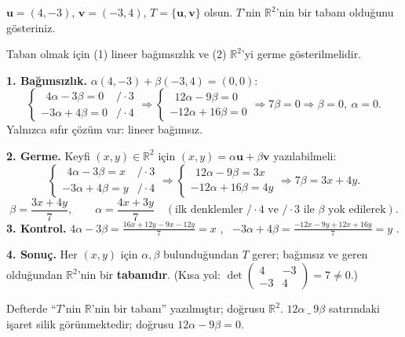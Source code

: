 \begin{soru}
$\mathbf u=(4,-3)$, $\mathbf v=(-3,4)$, $T=\{\mathbf u,\mathbf v\}$ olsun. $T$'nin $\mathbb R^2$'nin bir tabanı olduğunu gösteriniz.
\end{soru}
\begin{cevap}
Taban olmak için (1) lineer bağımsızlık ve (2) $\mathbb R^2$'yi germe gösterilmelidir.

\textbf{1. Bağımsızlık.} $\alpha(4,-3)+\beta(-3,4)=(0,0)$:
\[
\begin{cases}\ \ 4\alpha-3\beta=0 & /\cdot 3\\ -3\alpha+4\beta=0 & /\cdot 4\end{cases}
\Rightarrow
\begin{cases}\ \ 12\alpha-9\beta=0\\ -12\alpha+16\beta=0\end{cases}
\Rightarrow 7\beta=0\Rightarrow\beta=0,\ \alpha=0 .
\]
Yalnızca sıfır çözüm var: lineer bağımsız.

\textbf{2. Germe.} Keyfi $(x,y)\in\mathbb R^2$ için $(x,y)=\alpha\mathbf u+\beta\mathbf v$ yazılabilmeli:
\[
\begin{cases}\ \ 4\alpha-3\beta=x & /\cdot 3\\ -3\alpha+4\beta=y & /\cdot 4\end{cases}
\Rightarrow
\begin{cases}\ \ 12\alpha-9\beta=3x\\ -12\alpha+16\beta=4y\end{cases}
\Rightarrow 7\beta=3x+4y .
\]
\[
\beta=\frac{3x+4y}{7},\qquad \alpha=\frac{4x+3y}{7}\quad(\text{ilk denklemler } /\cdot4 \text{ ve } /\cdot3 \text{ ile } \beta \text{ yok edilerek}).
\]
\textbf{3. Kontrol.} $4\alpha-3\beta=\frac{16x+12y-9x-12y}{7}=x$ \checkmark, \ $-3\alpha+4\beta=\frac{-12x-9y+12x+16y}{7}=y$ \checkmark.

\textbf{4. Sonuç.} Her $(x,y)$ için $\alpha,\beta$ bulunduğundan $T$ gerer; bağımsız ve geren olduğundan $\mathbb R^2$'nin bir \textbf{tabanıdır}. (Kısa yol: $\det\begin{pmatrix}4&-3\\-3&4\end{pmatrix}=7\neq0$.)
\end{cevap}

\begin{bilgi}
Defterde ``$T$'nin $\mathbb R$'nin bir tabanı'' yazılmıştır; doğrusu $\mathbb R^2$. $12\alpha\ \_\ 9\beta$ satırındaki işaret silik görünmektedir; doğrusu $12\alpha-9\beta=0$.
\end{bilgi}

